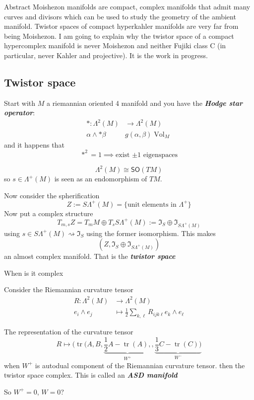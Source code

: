 \begin{thing6}{Abstract}
 Moishezon manifolds are compact, complex manifolds that admit many curves and divisors which can be used to study the geometry of the ambient manifold. Twistor spaces of compact hyperkahler manifolds are very far from being Moishezon. I am going to explain why the twistor space of a compact hypercomplex manifold is never Moishezon and neither Fujiki class C (in particular, never Kahler and projective). It is the work in progress.
\end{thing6}
\vspace{2em}

\subsection{Twistor space}


Start with $M$ a riemannian oriented 4 manifold  and you have the \textit{\textbf{Hodge star operator}}:
\begin{align*}
	*: \Lambda^{2}(M) &\longrightarrow \Lambda^{2}(M) \\
	\alpha\wedge *\beta &g(\alpha,\beta)\operatorname{Vol}_M
\end{align*}
and it happens that
 \[*^2=1\implies \text{exist $\pm 1$ eigenspaces} \]

 \begin{remark}\leavevmode
 	\[\Lambda^{2}(M)\cong \mathsf{SO}(TM)\]
so $s\in\Lambda^{+}(M)$ is seen as an endomorphism of $TM$.
 \end{remark}

 Now consider the spherification
  \[Z:=S\Lambda^{+}(M)=\{\text{unit elements in }\Lambda^+ \}\]
Now put a complex structure 
\[T_{m,s}Z=T_mM\oplus T_sS\Lambda^{+}(M):=\mathfrak{I}_S\oplus \mathfrak{I}_{S\Lambda^{+}(M)}\]
using $s\in S\Lambda^{+}(M)\rightsquigarrow \mathfrak{I}_S$ using the former isomorphism. This makes
\[(Z,\mathfrak{I}_S\oplus \mathfrak{I}_{S\Lambda^{+}(M)})\]
an almost complex manifold. That is the \textit{\textbf{twistor space}}
\begin{question}\leavevmode
	When is it complex
\end{question}
Consider the Riemannian curvature tensor
\begin{align*}
	R: \Lambda^{2}(M) &\longrightarrow \Lambda^{2}(M) \\
	e_i\wedge e_j &\longmapsto \frac{1}{2} \sum_{k,\ell}R_{ijk\ell}e_k\wedge e_\ell
\end{align*}
\begin{thm}\leavevmode
	The representation of the curvature tensor
	\[R\longmapsto(\operatorname{tr}(A,B,\underbrace{\frac{1}{2}A-\operatorname{tr}(A),}_{W^+},\underbrace{\frac{1}{3}C-\operatorname{tr}(C))}_{W^-}\]
	when $W^+$ is autodual component of the Riemannian curvature tensor.
then the twistor space complex. This is called an \textit{\textbf{ASD manifold} }

So $W^+=0$, $W=0$?
\end{thm}


